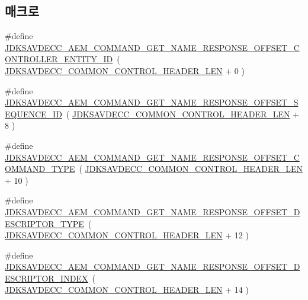 \subsection*{매크로}
\begin{DoxyCompactItemize}
\item 
\#define \hyperlink{group__command__get__name__response_ga44e8b766f45d0f39de1762c5e45e9137}{J\+D\+K\+S\+A\+V\+D\+E\+C\+C\+\_\+\+A\+E\+M\+\_\+\+C\+O\+M\+M\+A\+N\+D\+\_\+\+G\+E\+T\+\_\+\+N\+A\+M\+E\+\_\+\+R\+E\+S\+P\+O\+N\+S\+E\+\_\+\+O\+F\+F\+S\+E\+T\+\_\+\+C\+O\+N\+T\+R\+O\+L\+L\+E\+R\+\_\+\+E\+N\+T\+I\+T\+Y\+\_\+\+ID}~( \hyperlink{group__jdksavdecc__avtp__common__control__header_gaae84052886fb1bb42f3bc5f85b741dff}{J\+D\+K\+S\+A\+V\+D\+E\+C\+C\+\_\+\+C\+O\+M\+M\+O\+N\+\_\+\+C\+O\+N\+T\+R\+O\+L\+\_\+\+H\+E\+A\+D\+E\+R\+\_\+\+L\+EN} + 0 )
\item 
\#define \hyperlink{group__command__get__name__response_ga132e3d331dc10b391a1fe9ae387c3c38}{J\+D\+K\+S\+A\+V\+D\+E\+C\+C\+\_\+\+A\+E\+M\+\_\+\+C\+O\+M\+M\+A\+N\+D\+\_\+\+G\+E\+T\+\_\+\+N\+A\+M\+E\+\_\+\+R\+E\+S\+P\+O\+N\+S\+E\+\_\+\+O\+F\+F\+S\+E\+T\+\_\+\+S\+E\+Q\+U\+E\+N\+C\+E\+\_\+\+ID}~( \hyperlink{group__jdksavdecc__avtp__common__control__header_gaae84052886fb1bb42f3bc5f85b741dff}{J\+D\+K\+S\+A\+V\+D\+E\+C\+C\+\_\+\+C\+O\+M\+M\+O\+N\+\_\+\+C\+O\+N\+T\+R\+O\+L\+\_\+\+H\+E\+A\+D\+E\+R\+\_\+\+L\+EN} + 8 )
\item 
\#define \hyperlink{group__command__get__name__response_gab6161414a9dd68b0f2dba62ab6a4691e}{J\+D\+K\+S\+A\+V\+D\+E\+C\+C\+\_\+\+A\+E\+M\+\_\+\+C\+O\+M\+M\+A\+N\+D\+\_\+\+G\+E\+T\+\_\+\+N\+A\+M\+E\+\_\+\+R\+E\+S\+P\+O\+N\+S\+E\+\_\+\+O\+F\+F\+S\+E\+T\+\_\+\+C\+O\+M\+M\+A\+N\+D\+\_\+\+T\+Y\+PE}~( \hyperlink{group__jdksavdecc__avtp__common__control__header_gaae84052886fb1bb42f3bc5f85b741dff}{J\+D\+K\+S\+A\+V\+D\+E\+C\+C\+\_\+\+C\+O\+M\+M\+O\+N\+\_\+\+C\+O\+N\+T\+R\+O\+L\+\_\+\+H\+E\+A\+D\+E\+R\+\_\+\+L\+EN} + 10 )
\item 
\#define \hyperlink{group__command__get__name__response_gabc78fc80623c64b2c5b177936dd7b869}{J\+D\+K\+S\+A\+V\+D\+E\+C\+C\+\_\+\+A\+E\+M\+\_\+\+C\+O\+M\+M\+A\+N\+D\+\_\+\+G\+E\+T\+\_\+\+N\+A\+M\+E\+\_\+\+R\+E\+S\+P\+O\+N\+S\+E\+\_\+\+O\+F\+F\+S\+E\+T\+\_\+\+D\+E\+S\+C\+R\+I\+P\+T\+O\+R\+\_\+\+T\+Y\+PE}~( \hyperlink{group__jdksavdecc__avtp__common__control__header_gaae84052886fb1bb42f3bc5f85b741dff}{J\+D\+K\+S\+A\+V\+D\+E\+C\+C\+\_\+\+C\+O\+M\+M\+O\+N\+\_\+\+C\+O\+N\+T\+R\+O\+L\+\_\+\+H\+E\+A\+D\+E\+R\+\_\+\+L\+EN} + 12 )
\item 
\#define \hyperlink{group__command__get__name__response_ga530fed02ef854f4ef7591699ccdc5a33}{J\+D\+K\+S\+A\+V\+D\+E\+C\+C\+\_\+\+A\+E\+M\+\_\+\+C\+O\+M\+M\+A\+N\+D\+\_\+\+G\+E\+T\+\_\+\+N\+A\+M\+E\+\_\+\+R\+E\+S\+P\+O\+N\+S\+E\+\_\+\+O\+F\+F\+S\+E\+T\+\_\+\+D\+E\+S\+C\+R\+I\+P\+T\+O\+R\+\_\+\+I\+N\+D\+EX}~( \hyperlink{group__jdksavdecc__avtp__common__control__header_gaae84052886fb1bb42f3bc5f85b741dff}{J\+D\+K\+S\+A\+V\+D\+E\+C\+C\+\_\+\+C\+O\+M\+M\+O\+N\+\_\+\+C\+O\+N\+T\+R\+O\+L\+\_\+\+H\+E\+A\+D\+E\+R\+\_\+\+L\+EN} + 14 )

\end{DoxyCompactItemize}
